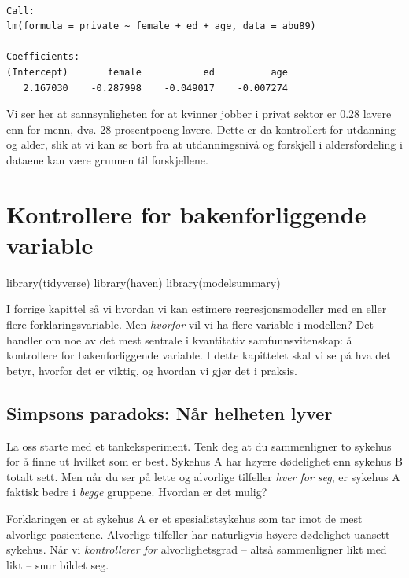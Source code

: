 \documentclass[
  norsk,
  letterpaper,
  DIV=11,
  numbers=noendperiod]{scrreprt}
\newenvironment{Shaded}{\begin{snugshade}}{\end{snugshade}}
\newcommand{\FunctionTok}[1]{\textcolor[rgb]{0.28,0.35,0.67}{#1}}
\newcommand{\NormalTok}[1]{\textcolor[rgb]{0.00,0.23,0.31}{#1}}
\theoremstyle{definition}
\theoremstyle{remark}
\begin{document}
\begin{verbatim}

Call:
lm(formula = private ~ female + ed + age, data = abu89)

Coefficients:
(Intercept)       female           ed          age  
   2.167030    -0.287998    -0.049017    -0.007274  
\end{verbatim}

Vi ser her at sannsynligheten for at kvinner jobber i privat sektor er
0.28 lavere enn for menn, dvs. 28 prosentpoeng lavere. Dette er da
kontrollert for utdanning og alder, slik at vi kan se bort fra at
utdanningsnivå og forskjell i aldersfordeling i dataene kan være grunnen
til forskjellene.

\chapter{Kontrollere for bakenforliggende
variable}\label{kontrollere-for-bakenforliggende-variable}

\begin{Shaded}
\begin{Highlighting}[]
\FunctionTok{library}\NormalTok{(tidyverse)}
\FunctionTok{library}\NormalTok{(haven)}
\FunctionTok{library}\NormalTok{(modelsummary)}
\end{Highlighting}
\end{Shaded}

I forrige kapittel så vi hvordan vi kan estimere regresjonsmodeller med
en eller flere forklaringsvariable. Men \emph{hvorfor} vil vi ha flere
variable i modellen? Det handler om noe av det mest sentrale i
kvantitativ samfunnsvitenskap: å kontrollere for bakenforliggende
variable. I dette kapittelet skal vi se på hva det betyr, hvorfor det er
viktig, og hvordan vi gjør det i praksis.

\section{Simpsons paradoks: Når helheten
lyver}\label{simpsons-paradoks-nuxe5r-helheten-lyver}

La oss starte med et tankeksperiment. Tenk deg at du sammenligner to
sykehus for å finne ut hvilket som er best. Sykehus A har høyere
dødelighet enn sykehus B totalt sett. Men når du ser på lette og
alvorlige tilfeller \emph{hver for seg}, er sykehus A faktisk bedre i
\emph{begge} gruppene. Hvordan er det mulig?

Forklaringen er at sykehus A er et spesialistsykehus som tar imot de
mest alvorlige pasientene. Alvorlige tilfeller har naturligvis høyere
dødelighet uansett sykehus. Når vi \emph{kontrollerer for}
alvorlighetsgrad -- altså sammenligner likt med likt -- snur bildet seg.
\end{document}
